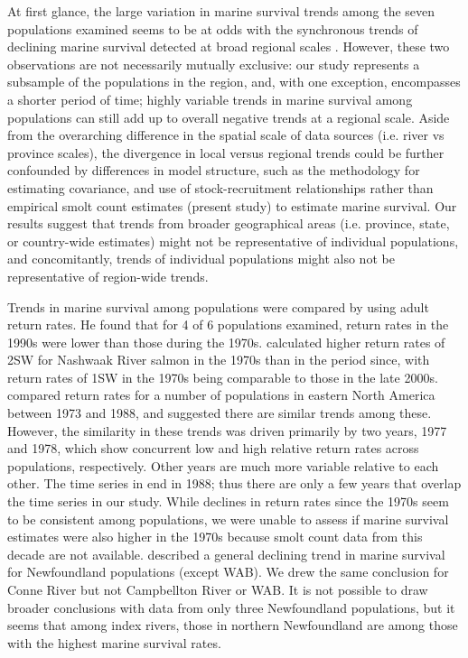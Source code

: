 \documentclass[12pt]{article}
\begin{document}
At first glance, the large variation in marine survival trends among the seven
populations examined seems to be at odds with the synchronous
trends of declining marine survival detected at broad regional scales
\citep{Olmos2019}. However, these two observations are not necessarily mutually
exclusive: our study represents a subsample of the populations in the region,
and, with one exception, encompasses a shorter period of time; highly variable 
trends in marine survival among populations can still add
up to overall negative trends at a regional scale.
Aside from the overarching difference in the spatial scale of data sources
(i.e. river vs province scales), the divergence in local versus regional
trends could be further confounded by differences in model structure, such as
the methodology for estimating covariance, and use of stock-recruitment
relationships \citep{Olmos2019} rather than empirical smolt count estimates 
(present study) to estimate marine survival.
Our results suggest that trends from broader geographical areas (i.e.
province, state, or country-wide estimates) might not be representative of
individual populations, and concomitantly, trends of individual populations
might also not be representative of region-wide trends.

Trends in marine survival
among populations were compared by \citet{Chaput2012a} using adult return rates.
He found that for 4 of 6 populations examined, return rates in the 1990s 
were lower than those during the 1970s.
\citet{Gibson2016} calculated higher return rates of 2SW for Nashwaak River salmon in
the 1970s than in the period since, with return rates of 1SW in the 1970s
being comparable to those in the late 2000s.
\citet{Friedland1993} compared return rates for a number of populations in eastern
North America between 1973 and 1988, and suggested there are similar trends among these. 
However, the similarity in these trends was driven primarily by two years, 1977 and 1978, which
show concurrent low and high relative return rates across populations,
respectively. Other years are much more variable relative to each other.
The time series in \citet{Friedland1993} end in  
1988; thus there are only a few years that overlap the
time series in our study.
While declines in return rates since the 1970s seem to be consistent among
populations, we were unable to assess if marine survival estimates were also
higher in the 1970s because smolt count data from this decade are not available.
\citet{Dempson2003} described a general declining trend in marine survival for
Newfoundland populations (except WAB). We drew the same conclusion for Conne
River but not Campbellton River or WAB. It is not possible to draw broader
conclusions with data from only three Newfoundland populations, but it seems
that among index rivers, those in northern Newfoundland are among those with
the highest marine survival rates.
\end{document}
